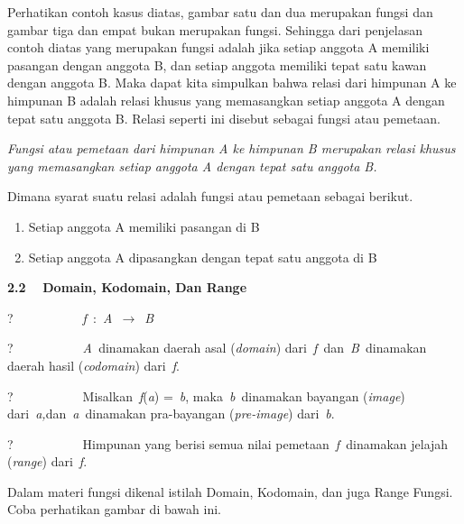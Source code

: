 \documentclass[11pt,fleqn]{book} %
\begin{document}
\noindent 

\noindent Perhatikan contoh kasus diatas, gambar satu dan dua merupakan fungsi dan gambar tiga dan empat bukan merupakan fungsi. Sehingga dari penjelasan contoh diatas yang merupakan fungsi adalah jika setiap anggota A memiliki pasangan dengan anggota B, dan setiap anggota memiliki tepat satu kawan dengan anggota B. Maka dapat kita simpulkan bahwa relasi dari himpunan A ke himpunan B adalah relasi khusus yang memasangkan setiap anggota A dengan tepat satu anggota B. Relasi seperti ini disebut sebagai fungsi atau pemetaan.

\noindent \textit{Fungsi atau pemetaan dari himpunan A ke himpunan B merupakan relasi khusus yang memasangkan setiap anggota A dengan tepat satu anggota B.}

\noindent Dimana syarat suatu relasi adalah fungsi atau pemetaan sebagai berikut.

\begin{enumerate}
\item  Setiap anggota A memiliki pasangan di B

\item  Setiap anggota A dipasangkan dengan tepat satu anggota di B
\end{enumerate}

\noindent 

\noindent 

\noindent 

\noindent 

\noindent \textbf{2.2 }~~\textbf{Domain, Kodomain, Dan Range}

\noindent \textbf{}

\noindent ?~~~~~~~~~~~\textit{f~}:~\textit{A~}$\mathrm{\to}$~\textit{B}

\noindent ?~~~~~~~~~~~\textit{A~}dinamakan daerah asal (\textit{domain}) dari~\textit{f~}dan~\textit{B~}dinamakan daerah hasil (\textit{codomain}) dari~\textit{f}.

\noindent ?~~~~~~~~~~~Misalkan~\textit{f}(\textit{a}) =~\textit{b}, maka~\textit{b~}dinamakan bayangan (\textit{image}) dari~\textit{a,}dan~\textit{a~}dinamakan pra-bayangan (\textit{pre-image}) dari~\textit{b}.

\noindent ?~~~~~~~~~~~Himpunan yang berisi semua nilai pemetaan~\textit{f~}dinamakan jelajah (\textit{range}) dari~\textit{f}.

\noindent 

\noindent Dalam materi fungsi dikenal istilah Domain, Kodomain, dan juga Range Fungsi. Coba perhatikan gambar di bawah ini.
\end{document}

